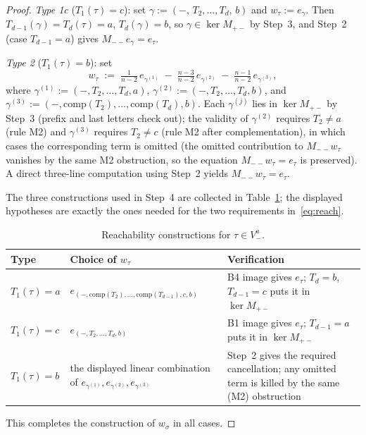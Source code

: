 \documentclass{amsart}
\theoremstyle{definition}
\theoremstyle{remark}
\begin{document}
\begin{proof}
\smallskip
\textit{Type 1c} ($T_1(\tau) = c$): set
$\gamma := (-,\, T_2, \ldots, T_d,\, b)$ and $w_\tau := e_\gamma$.
Then $T_{d-1}(\gamma) = T_d(\tau) = a$, $T_d(\gamma) = b$, so
$\gamma \in \ker M_{+-}$ by Step~3, and Step~2 (case $T_{d-1} = a$)
gives $M_{--} e_\gamma = e_\tau$.

\smallskip
\textit{Type 2} ($T_1(\tau) = b$): set
\[
  w_\tau \;:=\; \tfrac{1}{n-2}\, e_{\gamma^{(1)}}
            \;-\; \tfrac{n-3}{n-2}\, e_{\gamma^{(2)}}
            \;-\; \tfrac{n-1}{n-2}\, e_{\gamma^{(3)}},
\]
where $\gamma^{(1)} := (-, T_2, \ldots, T_d, a)$,
$\gamma^{(2)} := (-, T_2, \ldots, T_d, b)$, and
$\gamma^{(3)} := (-, \mathrm{comp}(T_2), \ldots, \mathrm{comp}(T_d),
b)$.  Each $\gamma^{(j)}$ lies in $\ker M_{+-}$ by Step~3
(prefix and last letters check out); the validity of
$\gamma^{(2)}$ requires $T_2 \neq a$ (rule M2) and
$\gamma^{(3)}$ requires $T_2 \neq c$ (rule M2 after
complementation), in which cases the corresponding term is
omitted (the omitted contribution to $M_{--} w_\tau$ vanishes by
the same M2 obstruction, so the equation $M_{--} w_\tau = e_\tau$
is preserved).  A direct three-line computation using Step~2
yields $M_{--} w_\tau = e_\tau$.

The three constructions used in Step~4 are collected in
Table~\ref{tab:reachability-types}; the displayed hypotheses are
exactly the ones needed for the two requirements in~\eqref{eq:reach}.

\begin{table}[ht]
\centering
\footnotesize
\caption{Reachability constructions for $\tau \in V_-^a$.}
\label{tab:reachability-types}
\begin{tabular}{@{}p{}p{}p{}@{}}
\toprule
Type & Choice of $w_\tau$ & Verification \\
\midrule
$T_1(\tau)=a$ & $e_{(-,\mathrm{comp}(T_2),\ldots,\mathrm{comp}(T_{d-1}),c,b)}$ & B4 image gives $e_\tau$; $T_d=b$, $T_{d-1}=c$ puts it in $\ker M_{+-}$ \\
$T_1(\tau)=c$ & $e_{(-,T_2,\ldots,T_d,b)}$ & B1 image gives $e_\tau$; $T_{d-1}=a$ puts it in $\ker M_{+-}$ \\
$T_1(\tau)=b$ & the displayed linear combination of $e_{\gamma^{(1)}},e_{\gamma^{(2)}},e_{\gamma^{(3)}}$ & Step~2 gives the required cancellation; any omitted term is killed by the same \textup{(M2)} obstruction \\
\bottomrule
\end{tabular}
\end{table}

This completes the construction of $w_\sigma$ in all cases.
\end{proof}
\end{document}
